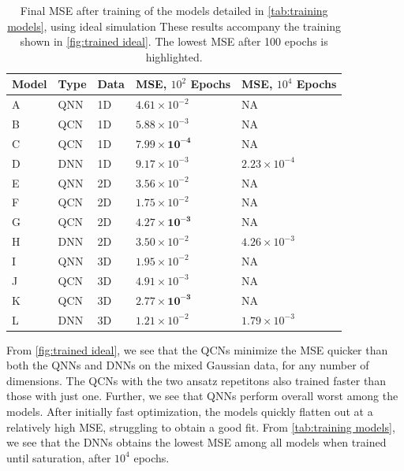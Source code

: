 \begin{table}[H]
\centering
\caption{Final MSE after training of the models detailed in \cref{tab:training models}, using ideal simulation These results accompany the training shown in \cref{fig:trained ideal}. The lowest MSE after 100 epochs is highlighted.}
\begin{tabular}{|l|l|l|l|l|}
\hline
Model& Type& Data& MSE, $10^{2}$ Epochs& MSE, $10^{4}$ Epochs \\ \hline
A    & QNN & 1D  &  $4.61\times 10^{-2}$  & NA   \\ \hline
B    & QCN & 1D  & $5.88\times 10^{-3}$  & NA \\ \hline
C    & QCN & 1D  & $\boldsymbol{7.99\times 10^{-4}}$  & NA  \\ \hline
D    & DNN & 1D  & $9.17\times 10^{-3}$ & $2.23\times 10^{-4}$  \\ \Xhline{2\arrayrulewidth}
E    & QNN & 2D  &  $3.56\times 10^{-2}$ & NA  \\ \hline
F    & QCN & 2D  &  $1.75\times 10^{-2}$ & NA  \\ \hline
G    & QCN & 2D  &  $\boldsymbol{4.27\times 10^{-3}}$ & NA  \\ \hline
H    & DNN & 2D  &  $3.50\times10^{-2}$ & $4.26\times10^{-3}$\\ 
\Xhline{2\arrayrulewidth}
I    & QNN & 3D  &  $1.95\times 10^{-2}$& NA  \\ \hline
J    & QCN & 3D  &  $4.91\times 10^{-3}$ & NA  \\ \hline
K    & QCN & 3D  &  $\boldsymbol{2.77\times10^{-3}}$  & NA  \\ \hline
L    & DNN & 3D  &  $1.21\times10^{-2}$  & $1.79\times10^{-3}$  \\ \hline
\end{tabular}
 
\label{tab:training models mse}
\end{table}

From \cref{fig:trained ideal}, we see that the QCNs minimize the MSE quicker than both the QNNs and DNNs on the mixed Gaussian data, for any number of dimensions. The QCNs with the two ansatz repetitons also trained faster than those with just one. Further, we see that QNNs perform overall worst among the models. After initially fast optimization, the models quickly flatten out at a relatively high MSE, struggling to obtain a good fit. From \cref{tab:training models}, we see that the DNNs obtains the lowest MSE among all models when trained until saturation, after $10^4$ epochs.


